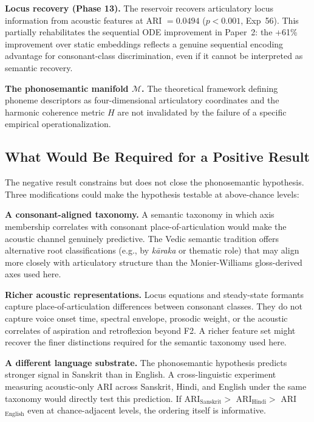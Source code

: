 \documentclass{article}
\begin{document}
\textbf{Locus recovery (Phase 13).} The reservoir recovers articulatory
locus information from acoustic features at ARI $= 0.0494$
($p < 0.001$, Exp~56). This partially rehabilitates the sequential ODE
improvement in Paper~2: the +61\% improvement over static embeddings
reflects a genuine sequential encoding advantage for consonant-class
discrimination, even if it cannot be interpreted as semantic recovery.

\textbf{The phonosemantic manifold $\mathcal{M}$.} The theoretical
framework defining phoneme descriptors as four-dimensional articulatory
coordinates and the harmonic coherence metric $H$
\citep{kumar2026phonosemantic} are not invalidated by the failure of
a specific empirical operationalization.

\subsection{What Would Be Required for a Positive Result}

The negative result constrains but does not close the phonosemantic
hypothesis. Three modifications could make the hypothesis testable at
above-chance levels:

\textbf{A consonant-aligned taxonomy.} A semantic taxonomy in which axis
membership correlates with consonant place-of-articulation would make
the acoustic channel genuinely predictive. The Vedic semantic tradition
offers alternative root classifications (e.g., by \textit{kāraka} or
thematic role) that may align more closely with articulatory structure
than the Monier-Williams gloss-derived axes used here.

\textbf{Richer acoustic representations.} Locus equations and
steady-state formants capture place-of-articulation differences between
consonant classes. They do not capture voice onset time, spectral
envelope, prosodic weight, or the acoustic correlates of aspiration and
retroflexion beyond F2. A richer feature set might recover the finer
distinctions required for the semantic taxonomy used here.

\textbf{A different language substrate.} The phonosemantic hypothesis
predicts stronger signal in Sanskrit than in English. A cross-linguistic
experiment measuring acoustic-only ARI across Sanskrit, Hindi, and
English under the same taxonomy would directly test this prediction.
If ARI$_\text{Sanskrit} >$ ARI$_\text{Hindi} >$ ARI$_\text{English}$
even at chance-adjacent levels, the ordering itself is informative.
\end{document}
